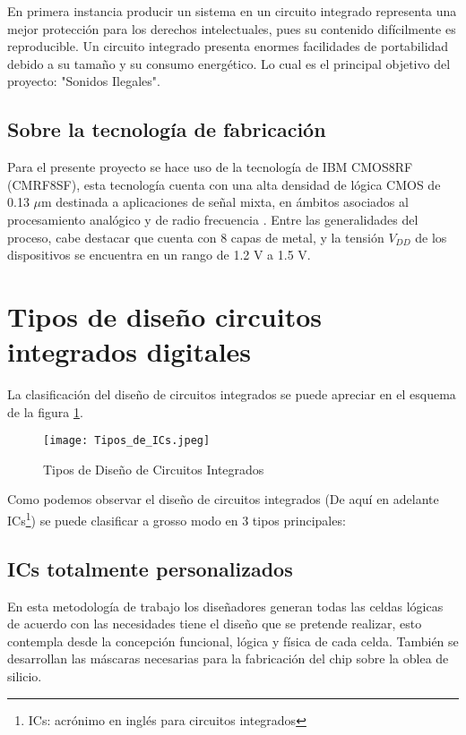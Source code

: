 {En primera instancia producir un sistema en un circuito integrado representa una mejor protección para los derechos intelectuales, pues su contenido difícilmente es reproducible. Un circuito integrado presenta enormes facilidades de portabilidad debido a su tamaño y su consumo energético. Lo cual es el principal objetivo del proyecto: "Sonidos Ilegales".

\subsection*{Sobre la tecnología de fabricación}

Para el presente proyecto se hace uso de la tecnología de IBM CMOS8RF (CMRF8SF), esta tecnología cuenta con una alta densidad de lógica CMOS de  0.13 $\mu$m destinada a aplicaciones de señal mixta, en ámbitos asociados al procesamiento analógico y de radio frecuencia . Entre las generalidades del proceso, cabe destacar que cuenta con 8 capas de metal, y la tensión $V_{DD}$ de los dispositivos se encuentra en un rango de 1.2 V a 1.5 V.\\

\section{Tipos de diseño circuitos integrados digitales}

La clasificación del diseño de circuitos integrados se puede apreciar en el esquema de la figura \ref{ICs}.

\begin{figure}[h]
\texttt{[image: Tipos\_de\_ICs.jpeg]}
\centering
\caption{Tipos de Diseño de Circuitos Integrados}
\label{ICs}
\end{figure}
Como podemos observar el diseño de circuitos integrados (De aquí en adelante ICs\footnote{ICs: acrónimo en inglés para circuitos integrados}) se puede clasificar a grosso modo en 3 tipos principales:

\subsection{\textbf{ICs totalmente personalizados}}

En esta metodología de trabajo los diseñadores generan todas las celdas lógicas de acuerdo con las necesidades tiene el diseño que se pretende realizar, esto contempla desde la concepción funcional, lógica y física de cada celda. También se desarrollan las máscaras necesarias para la fabricación del chip sobre la oblea de silicio.

}
